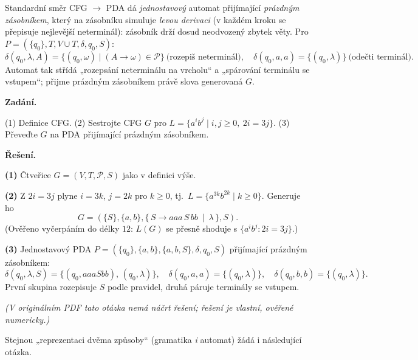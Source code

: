 \documentclass[11pt,a4paper]{article}
\begin{document}
\begin{intuice}
Standardní směr CFG $\to$ PDA dá \emph{jednostavový} automat přijímající \emph{prázdným zásobníkem}, který na zásobníku simuluje \emph{levou derivaci} (v každém kroku se přepisuje nejlevější neterminál): zásobník drží dosud neodvozený zbytek věty. Pro $P=(\{q_0\},T,V\cup T,\delta,q_0,S)$:
\[ \delta(q_0,\lambda,A)=\{(q_0,\omega)\mid (A\to\omega)\in\mathcal P\}\ \text{(rozepiš neterminál)},\quad \delta(q_0,a,a)=\{(q_0,\lambda)\}\ \text{(odečti terminál)}. \]
Automat tak střídá „rozepsání neterminálu na vrcholu`` a „spárování terminálu se vstupem``; přijme prázdným zásobníkem právě slova generovaná $G$.
\end{intuice}

\begin{priklad}
\par
\textbf{Zadání.}\par
(1) Definice CFG. (2) Sestrojte CFG $G$ pro $L=\{a^ib^j\mid i,j\ge 0,\ 2i=3j\}$. (3) Převeďte $G$ na PDA přijímající prázdným zásobníkem.

\smallskip
\textbf{Řešení.}\par
\textbf{(1)} Čtveřice $G=(V,T,\mathcal P,S)$ jako v definici výše.

\textbf{(2)} Z $2i=3j$ plyne $i=3k$, $j=2k$ pro $k\ge 0$, tj.\ $L=\{a^{3k}b^{2k}\mid k\ge 0\}$. Generuje ho
\[ G=(\{S\},\{a,b\},\{\,S\to aaa\,S\,bb\ \mid\ \lambda\,\},S). \]
(Ověřeno vyčerpáním do délky $12$: $L(G)$ se přesně shoduje s $\{a^ib^j:2i=3j\}$.)

\textbf{(3)} Jednostavový PDA $P=(\{q_0\},\{a,b\},\{a,b,S\},\delta,q_0,S)$ přijímající prázdným zásobníkem:
\[ \delta(q_0,\lambda,S)=\{(q_0,aaaSbb),\,(q_0,\lambda)\},\quad \delta(q_0,a,a)=\{(q_0,\lambda)\},\quad \delta(q_0,b,b)=\{(q_0,\lambda)\}. \]
První skupina rozepisuje $S$ podle pravidel, druhá páruje terminály se vstupem.\par
\emph{(V originálním PDF tato otázka nemá náčrt řešení; řešení je vlastní, ověřené numericky.)}
\end{priklad}

Stejnou „reprezentaci dvěma způsoby`` (gramatika \emph{i} automat) žádá i následující otázka.
\end{document}
